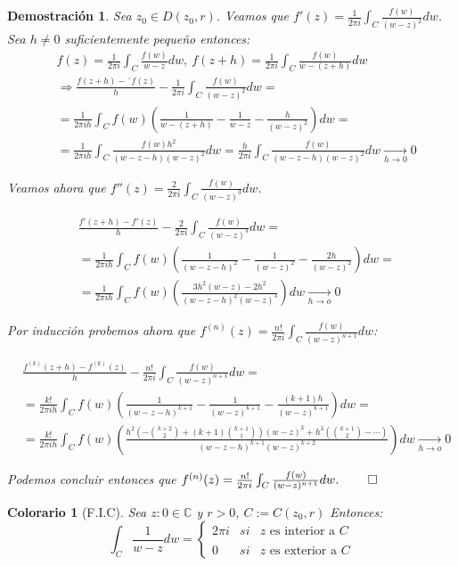 \documentclass[10pt]{book}
\newtheorem*{dem}{Demostración}
\newtheorem{col}{Colorario}[chapter]
\newcommand{\C}{\mathbb{C}}
\begin{document}
\begin{dem}
Sea $z_0\in D(z_0,r)$. Veamos que $f'(z) = \frac{1}{2\pi i}\int_C \frac{f(w)}{(w-z)^{2}}dw$.
Sea $h\neq 0$ suficientemente pequeño entonces:
\begin{align*}
&f(z) = \frac{1}{2\pi i}\int_C \frac{f(w)}{w-z}dw,\ f(z+h) = \frac{1}{2\pi i}\int_C \frac{f(w)}{w-(z+h)}dw\\
&\Rightarrow \frac{f(z+h)-´f(z)}{h}- \frac{1}{2\pi i}\int_C \frac{f(w)}{(w-z)^{2}}dw =\\
&= \frac{1}{2\pi ih}\int_C f(w)\left(\frac{1}{w-(z+h)}-\frac{1}{w-z}-\frac{h}{(w-z)^2}\right)dw=\\
&= \frac{1}{2\pi i h}\int_C \frac{f(w)h^2}{(w-z-h)(w-z)^2}dw = \frac{h}{2\pi i}\int_C \frac{f(w)}{(w-z-h)(w-z)^2}dw \xrightarrow[h\to 0]{} 0
\end{align*}

Veamos ahora que $f''(z) = \frac{2}{2\pi i}\int_C \frac{f(w)}{(w-z)^{3}}dw$.

\begin{align*}
&\frac{f'(z+h)-f'(z)}{h} - \frac{2}{2\pi i}\int_C \frac{f(w)}{(w-z)^{3}}dw =\\
&=\frac{1}{2\pi i h}\int_C f(w)\left(\frac{1}{(w-z-h)^2}-\frac{1}{(w-z)^2}-\frac{2h}{(w-z)^2}\right)dw =\\
&= \frac{1}{2\pi ih}\int_C f(w) \left(\frac{3h^2(w-z)-2h^2}{(w-z-h)^2(w-z)^3}\right)dw \xrightarrow[h\to o]{} 0
\end{align*}

Por inducción probemos ahora  que $f^{(n)}(z) = \frac{n!}{2\pi i}\int_C \frac{f(w)}{(w-z)^{n+1}}dw$:

\begin{align*}
&\frac{f^{(k)}(z+h)-f^{(k)}(z)}{h} - \frac{n!}{2\pi i}\int_C \frac{f(w)}{(w-z)^{n+1}}dw=\\
&= \frac{k!}{2\pi i h}\int_Cf(w)\left(\frac{1}{(w-z-h)^{k+1}}-\frac{1}{(w-z)^{k+1}}-\frac{(k+1)h}{(w-z)^{k+1}}\right)dw=\\
&= \frac{k!}{2\pi i h}\int_C f(w)\left(\frac{h^2(-{k+2 \choose 2} + (k+1){k+1\choose 1})(w-z)^{k}+h^3({k+1\choose 2} -\cdots)}{(w-z-h)^{k+1}(w-z)^{k+2}}\right)dw \xrightarrow[h\to o]{} 0
\end{align*}

Podemos concluir entonces que $f^{(n)}(z) = \frac{n!}{2\pi i}\int_C \frac{f(w)}{(w-z)^{n+1}}dw.\ \qed$
\end{dem}


\begin{col}[F.I.C]
Sea $z:0\in\C$ y $r>0$, $C:=C(z_0,r)$ Entonces:
$$
\int_C \frac{1}{w-z}dw = \left\{ \begin{array}{lcc}
             2\pi i &   si  & z\text{ es interior a } C \\
             \\ 0 & si & z\text{ es exterior a } C
             \end{array}\right.
$$
\end{col}
\end{document}
